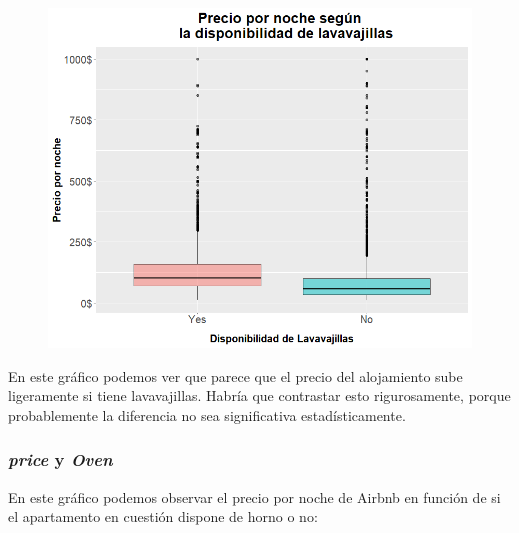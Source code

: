 \documentclass{article}
\begin{document}
\vspace{0.35cm}
\begin{figure}[h]
\hspace*{-0.15cm}
\centering
\includegraphics[scale = 0.6]{boxplot_precio_Dishwasher}
\end{figure}
\vspace{0.15cm}

En este gráfico podemos ver que parece que el precio del alojamiento sube ligeramente si tiene lavavajillas. Habría que contrastar esto rigurosamente, porque probablemente la diferencia no sea significativa estadísticamente.

\clearpage
\subsubsection{\emph{price} y \emph{Oven}}

En este gráfico podemos observar el precio por noche de Airbnb en función de si el apartamento en cuestión dispone de horno o no:
\end{document}
